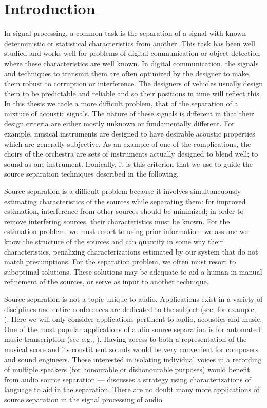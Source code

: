 \chapter{Introduction \label{chap:intro}}
In signal processing, a common task is the separation of a signal with known
deterministic or statistical characteristics from another. This task has been
well studied \cite{kay1993fundamentals} \cite{hayes2009statistical}
\cite{poor2013introduction} and works well for problems of digital communication
or object detection where these characteristics are well known. In digital
communication, the signals and techniques to transmit them are often optimized
by the designer to make them robust to corruption or interference. The designers
of vehicles usually design them to be predictable and reliable and so their
positions in time will reflect this. In this thesis we tacle a more difficult
problem, that of the separation of a mixture of acoustic signals. The nature of
these signals is different in that their design criteria are either
mostly unknown or fundamentally different. For example, musical instruments are
designed to have desirable acoustic properties which are generally subjective.
As an example of one of the complications, the choirs of the orchestra are sets
of instruments actually designed to blend well; to sound as one instrument.
Ironically, it is this criterion that we use to guide the source separation
techniques described in the following.

Source separation is a difficult problem because it involves simultaneuously
estimating characteristics of the sources while separating them: for improved
estimation, interference from other sources should be minimized; in order to
remove interfering sources, their characteristics must be known. For the
estimation problem, we must resort to using prior information: we assume we
know the structure of the sources and can quantify in some way their
characteristics, penalizing characterizations estimated by our system that do
not match presumptions. For the separation problem, we often must resort to
suboptimal solutions. These solutions may be adequate to aid a human in manual
refinement of the sources, or serve as input to another technique.

Source separation is not a topic unique to audio. 
Applications exist in a variety of disciplines and entire conferences are
dedicated to the subject (see, for example, \cite{zarzoso2010latent}).
Here we will only consider applications pertinent to audio, acoustics
and music. One of the most popular applications of audio source separation is
for automated music transcription (see e.g., \cite{bertin2010enforcing}). Having
access to both a representation of the musical score and its constituent
sounds would be very convenient for composers and sound
engineers. Those interested in isolating individual voices in a recording of
multiple speakers (for honourable or dishonourable purposes) would 
benefit from audio source separation --- \cite{mysore2012non} discusses a
strategy using characterizations of language to aid in the separation. There are
no doubt many more applications of source separation in the signal processing of
audio.

